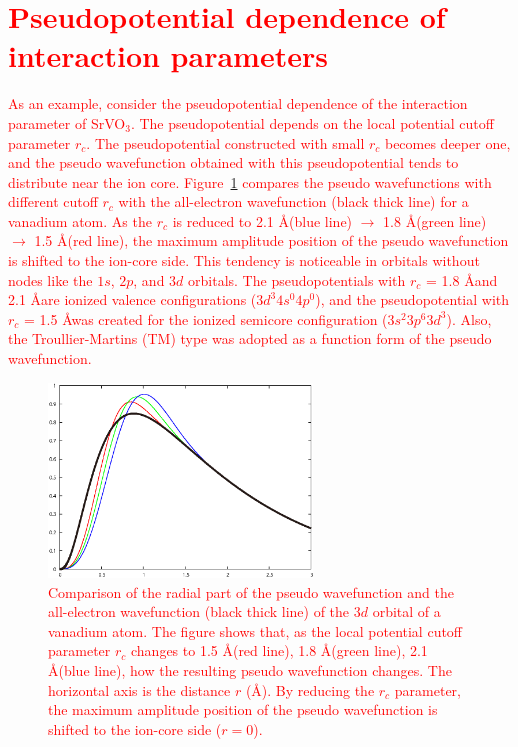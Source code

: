 \documentclass{article}
\newcommand{\tr}[1]{\textcolor{red}{#1}}
\begin{document}
\section{\label{pseudopotential}\tr{Pseudopotential dependence of interaction parameters}} 

\tr{As an example, consider the pseudopotential dependence of the interaction parameter of SrVO$_3$. The pseudopotential depends on the local potential cutoff parameter $r_c$. The pseudopotential constructed with small $r_c$ becomes deeper one, and the pseudo wavefunction obtained with this pseudopotential tends to distribute near the ion core. Figure~\ref{pwn-vs-aewn} compares the pseudo wavefunctions with different cutoff $r_c$ with the all-electron wavefunction (black thick line) for a vanadium atom. As the $r_c$ is reduced to 2.1 \AA (blue line) $\to$ 1.8 \AA (green line) $\to$ 1.5 \AA (red line), the maximum amplitude position of the pseudo wavefunction is shifted to the ion-core side. This tendency is noticeable in orbitals without nodes like the $1s$, $2p$, and $3d$ orbitals. The pseudopotentials with $r_c$ = 1.8 \AA and 2.1 \AA are ionized valence configurations ($3d^{3}4s^{0}4p^{0}$), and the pseudopotential with $r_c$ = 1.5 \AA was created for the ionized semicore configuration ($3s^{2}3p^{6}3d^{3}$). Also, the Troullier-Martins (TM) type was adopted as a function form of the pseudo wavefunction.} 
\begin{figure}[H] 
\centering
\includegraphics[width=7cm]{pwn_vs_aewn_V.eps}
\caption{\tr{Comparison of the radial part of the pseudo wavefunction and the all-electron wavefunction (black thick line) of the $3d$ orbital of a vanadium atom. The figure shows that, as the local potential cutoff parameter $r_c$ changes to 1.5 \AA (red line), 1.8 \AA (green line), 2.1 \AA (blue line), how the resulting pseudo wavefunction changes. The horizontal axis is the distance $r$ (\AA). By reducing the $r_c$ parameter, the maximum amplitude position of the pseudo wavefunction is shifted to the ion-core side ($r=0$).}} 
\label{pwn-vs-aewn}
\end{figure}
\end{document}
